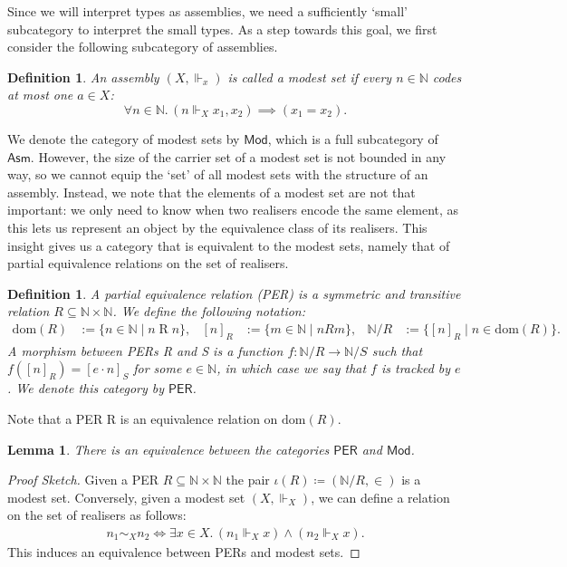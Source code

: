 \documentclass[10pt,a4paper]{article}
\newtheorem{lemma}[theorem]{Lemma}
\newtheorem{definition}[theorem]{Definition}
\theoremstyle{definition}
\theoremstyle{remark}
\renewcommand{\.}{.\,} %
\renewcommand{\:}{:} %
\newcommand{\bN}{\mathbb{N}}
\newcommand{\0}{\mathbf{0}}
\newcommand{\1}{\mathbf{1}}
\newcommand\<\langle
\renewcommand\>\rangle
\renewcommand\rm\mathrm
\newcommand{\Per}{\mathsf{PER}}
\newcommand{\Mod}{\mathsf{Mod}}
\newcommand{\Asm}{\mathsf{Asm}}
\theoremstyle{remark}
\begin{document}
Since we will interpret types as assemblies, we need a sufficiently `small' subcategory to interpret the small types. As a step towards this goal, we first consider the following subcategory of assemblies.
\begin{definition}
An assembly $(X, \Vdash_x)$ is called a \emph{modest set} if every $n \in \bN$ codes at most one $a \in X$: 
\[
    \forall n \in \bN \. (n \Vdash_X x_1, x_2) \implies(x_1 = x_2).
\]
\end{definition}
We denote the category of modest sets by $\Mod$, which is a full subcategory of $\Asm$. However, the size of the carrier set of a modest set is not bounded in any way, so we cannot equip the `set' of all modest sets with the structure of an assembly.
Instead, we note that the elements of a modest set are not that important: we only need to know when two realisers encode the same element, as this lets us represent an object by the equivalence class of its realisers.
This insight gives us a category that is equivalent to the modest sets, namely that of partial equivalence relations on the set of realisers. 
\begin{definition}
    A \emph{partial equivalence relation (PER)}  is a symmetric and transitive relation $R \subseteq \mathbb{N} \times \mathbb{N}$. We define the following notation: 
\begin{align*}
	\rm{dom}(R) &:= \{n \in \mathbb{N} \mid n\mathbin Rn\}, &
	[n]_R &:= \{m \in \mathbb{N} \mid nRm\}, &
	\mathbb{N} /R &:= \{[n]_R \mid n \in \rm{dom}(R)\}.
\end{align*} 
A morphism between PERs R and S is a function \( f : \bN / R \to \bN /S \) such that \( f([n]_R) = [e \cdot n]_S \) for some \( e \in \bN \), in which case we say that \( f \) is tracked by \( e \).
We denote this category by \( \Per \).
\end{definition}
Note that a PER R is an equivalence relation on \( \rm{dom}(R) \).
\begin{lemma}\label{lemma:per-mod-equiv}
There is an equivalence between the categories $\Per$ and $\Mod$.
\end{lemma}
\begin{proof}[Proof Sketch]
    Given a PER \( R \subseteq \bN \times \bN \) the pair $\iota (R) \coloneqq  (\bN/R, \in)$ is a modest set.
    Conversely, given a modest set \( (X, \Vdash_X) \), we can define a relation on the set of realisers as follows: \begin{align*}
            n_1\sim_{X}n_2 \iff \exists x \in X \. (n_1 \Vdash_X x) \land (n_2 \Vdash_X x).
    \end{align*}
    This induces an equivalence between PERs and modest sets.
\end{proof}
\end{document}
